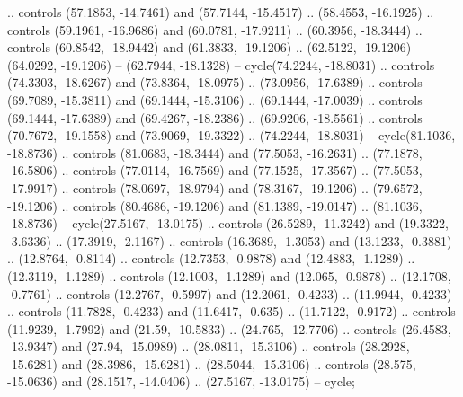 {    .. controls (57.1853, -14.7461) and (57.7144, -15.4517) .. (58.4553, -16.1925)
    .. controls (59.1961, -16.9686) and (60.0781, -17.9211) .. (60.3956, -18.3444)
    .. controls (60.8542, -18.9442) and (61.3833, -19.1206) .. (62.5122, -19.1206)
    -- (64.0292, -19.1206)
    -- (62.7944, -18.1328)
    -- cycle(74.2244, -18.8031)
    .. controls (74.3303, -18.6267) and (73.8364, -18.0975) .. (73.0956, -17.6389)
    .. controls (69.7089, -15.3811) and (69.1444, -15.3106) .. (69.1444, -17.0039)
    .. controls (69.1444, -17.6389) and (69.4267, -18.2386) .. (69.9206, -18.5561)
    .. controls (70.7672, -19.1558) and (73.9069, -19.3322) .. (74.2244, -18.8031)
    -- cycle(81.1036, -18.8736)
    .. controls (81.0683, -18.3444) and (77.5053, -16.2631) .. (77.1878, -16.5806)
    .. controls (77.0114, -16.7569) and (77.1525, -17.3567) .. (77.5053, -17.9917)
    .. controls (78.0697, -18.9794) and (78.3167, -19.1206) .. (79.6572, -19.1206)
    .. controls (80.4686, -19.1206) and (81.1389, -19.0147) .. (81.1036, -18.8736)
    -- cycle(27.5167, -13.0175)
    .. controls (26.5289, -11.3242) and (19.3322, -3.6336) .. (17.3919, -2.1167)
    .. controls (16.3689, -1.3053) and (13.1233, -0.3881) .. (12.8764, -0.8114)
    .. controls (12.7353, -0.9878) and (12.4883, -1.1289) .. (12.3119, -1.1289)
    .. controls (12.1003, -1.1289) and (12.065, -0.9878) .. (12.1708, -0.7761)
    .. controls (12.2767, -0.5997) and (12.2061, -0.4233) .. (11.9944, -0.4233)
    .. controls (11.7828, -0.4233) and (11.6417, -0.635) .. (11.7122, -0.9172)
    .. controls (11.9239, -1.7992) and (21.59, -10.5833) .. (24.765, -12.7706)
    .. controls (26.4583, -13.9347) and (27.94, -15.0989) .. (28.0811, -15.3106)
    .. controls (28.2928, -15.6281) and (28.3986, -15.6281) .. (28.5044, -15.3106)
    .. controls (28.575, -15.0636) and (28.1517, -14.0406) .. (27.5167, -13.0175)
    -- cycle;
}
